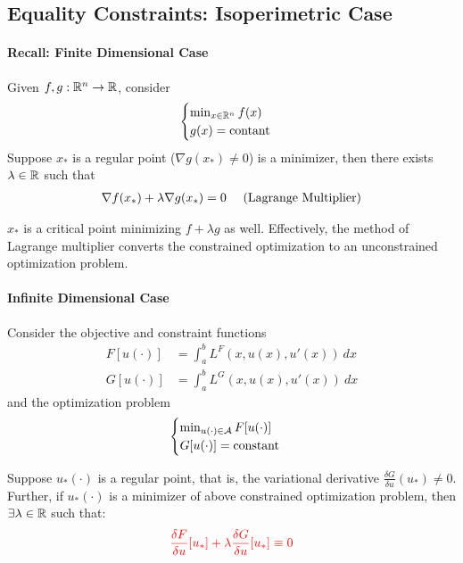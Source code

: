 \documentclass{article}
\begin{document}
	\subsection{Equality Constraints: Isoperimetric Case}
	\paragraph{Recall: Finite Dimensional Case} Given $f, g: \mathbb{R}^n \to \mathbb{R}$, consider
	\begin{align}
		\begin{cases}
			\min_{x \in \mathbb{R}^n} f(x) \\
			g(x) = \text{{contant}}
		\end{cases}
	\end{align}
	Suppose $x_*$ is a regular point ($\nabla g(x_*) \neq 0$) is a minimizer, then there exists $\lambda \in \mathbb{R}$ such that
	\begin{align}
		\nabla f(x_*) + \lambda \nabla g(x_*) = 0 \quad \text{{ (Lagrange Multiplier)}}
	\end{align}
	\begin{remark}
		$x_*$ is a critical point minimizing $f + \lambda g$ as well. Effectively, the method of Lagrange multiplier converts the constrained optimization to an unconstrained optimization problem.
	\end{remark}
	
	\paragraph{Infinite Dimensional Case} Consider the objective and constraint functions
	\begin{align}
		F[u(\cdot)] &= \int_a^b L^F(x, u(x), u'(x))\ dx \\
		G[u(\cdot)] &= \int_a^b L^G(x, u(x), u'(x))\ dx
	\end{align}
	and the optimization problem
	\begin{align}
		\begin{cases}
			\min_{u(\cdot) \in \mathcal{{A}}} F[u(\cdot)] \\
			G[u(\cdot)] = \text{{constant}}
		\end{cases}
	\end{align}

	\begin{theorem}
		Suppose $u_*(\cdot)$ is a regular point, that is, the variational derivative $\frac{\delta G}{\delta u}(u_*) \neq 0$.\\
		Further, if $u_*(\cdot)$ is a minimizer of above constrained optimization problem, then $\exists \lambda \in \mathbb{R}$ such that:
		\begin{align}
			\textcolor{red}{\frac{\delta F}{\delta u}[u_*] + \lambda \frac{\delta G}{\delta u}[u_*] \equiv 0}
		\end{align}
	\end{theorem}
\end{document}
